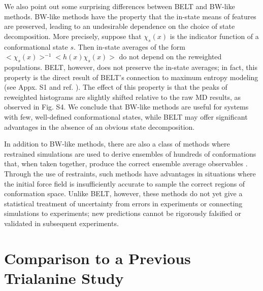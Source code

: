 \documentclass[journal=jacsat,manuscript=article]{achemso}
\begin{document}
We also point out some surprising differences between BELT and BW-like methods.  BW-like methods have the property that the in-state means of features are preserved, leading to an undesirable dependence on the choice of state decomposition.  More precisely, suppose that $\chi_s(x)$ is the indicator function of a conformational state $s$.  Then in-state averages of the form $<\chi_s(x)>^{-1} <h(x) \chi_s(x)>$ do not depend on the reweighted populations.  BELT, however, does not preserve the in-state averages; in fact, this property is the direct result of BELT's connection to maximum entropy modeling (see Appx. S1 and ref.  \cite{chodera2012}).  The effect of this property is that the peaks of reweighted histograms are slightly shifted relative to the raw MD results, as observed in Fig. S4.   We conclude that BW-like methods are useful for systems with few, well-defined conformational states, while BELT may offer significant advantages in the absence of an obvious state decomposition.  

In addition to BW-like methods, there are also a class of methods where restrained simulations are used to derive ensembles of hundreds of conformations that, when taken together, produce the correct ensemble average observables \cite{richter2007mumo, lindorff2005simultaneous}.  Through the use of restraints, such methods have advantages in situations where the initial force field is insufficiently accurate to sample the correct regions of conformation space.  Unlike BELT, however, these methods do not yet give a statistical treatment of uncertainty from errors in experiments or connecting simulations to experiments; new predictions cannot be rigorously falsified or validated in subsequent experiments.

\section*{Comparison to a Previous Trialanine Study}
\end{document}
